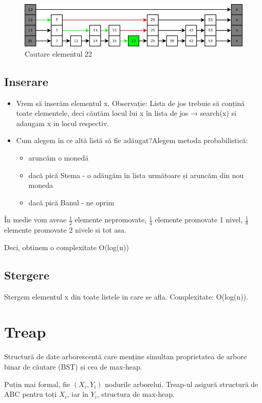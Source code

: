 \documentclass[11pt,a4paper]{article}
\theoremstyle{definition}
\theoremstyle{plain}
\theoremstyle{remark}
\begin{document}
\begin{figure}[H]
    \centering
    \includegraphics[width=0.75\linewidth]{skip-list-ex1.png}
    \caption{Cautare elementul 22}
    \label{fig:enter-label}
\end{figure}

\subsection*{Inserare}
\begin{itemize}
    \item Vrem să inserăm elementul x. Observație: Lista de jos trebuie să conțină toate elementele, deci căutăm locul lui x în lista de jos → search(x) si adaugam x in locul respectiv.
    \item Cum alegem în ce altă listă să ﬁe adăugat?Alegem metoda probabilistică:
    
    \begin{itemize}
        \item aruncăm o monedă
        \item  dacă pică Stema - o adăugăm în lista următoare și aruncăm din nou moneda
        \item dacă pică Banul - ne oprim
    \end{itemize}
\end{itemize}

În medie vom aveae $\frac{1}{2}$ elemente nepromovate, $\frac{1}{4}$ elemente promovate 1 nivel, $\frac{1}{8}$ elemente promovate 2 nivele si tot asa.

Deci, obtinem o complexitate O(log(n))

\subsection*{Stergere}
Stergem elementul x din toate listele in care se afla. Complexitate: O(log(n)).

\section{Treap}
Structură de date arborescentă care menține simultan proprietatea de arbore binar de căutare (BST) și cea de max-heap. 

Puțin mai formal, fie $(X_{i}, Y_{i})$ nodurile arborelui. Treap-ul asigură structură de ABC pentru toți $X_i$, iar în $Y_i$, structura de max-heap.
\end{document}

